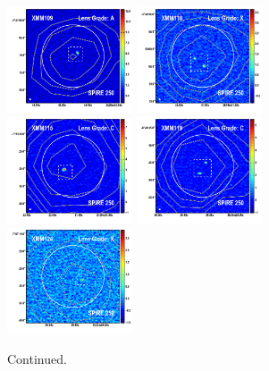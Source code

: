 \documentclass[iop]{emulateapj}
\begin{document}
\begin{figure}[!tbp] 
    \begin{centering}
\includegraphics[width=0.331\textwidth]{../Figures/overlays/XMM109_870_250.pdf}
\includegraphics[width=0.331\textwidth]{../Figures/overlays/XMM110_870_250.pdf}
\includegraphics[width=0.331\textwidth]{../Figures/overlays/XMM115_870_250.pdf}
\includegraphics[width=0.331\textwidth]{../Figures/overlays/XMM119_870_250.pdf}
\includegraphics[width=0.331\textwidth]{../Figures/overlays/XMM124_870_250.pdf}
\end{centering}

\caption{ Continued.}

\end{figure}
\end{document}
